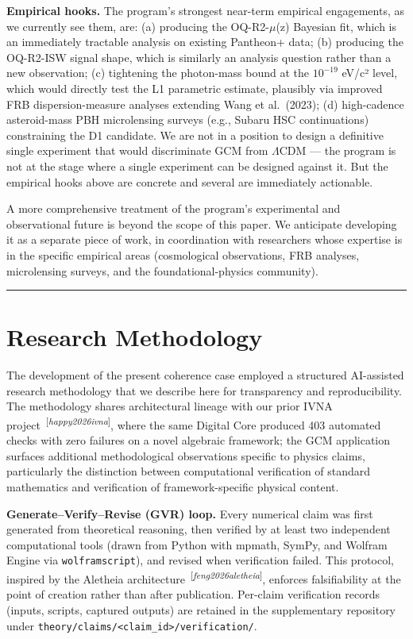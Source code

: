 \documentclass[12pt]{article}
\theoremstyle{definition}
\theoremstyle{remark}
\providecommand{\fallbackcite}[1]{\textsuperscript{[\textit{#1}]}}
\renewcommand{\cite}[1]{\fallbackcite{#1}}
\begin{document}
\textbf{Empirical hooks.} The program's strongest near-term empirical
engagements, as we currently see them, are: (a) producing the
OQ-R2-\(\mu\)(z) Bayesian fit, which is an immediately tractable
analysis on existing Pantheon+ data; (b) producing the OQ-R2-ISW signal
shape, which is similarly an analysis question rather than a new
observation; (c) tightening the photon-mass bound at the \(10^{-19}\)
eV/c² level, which would directly test the L1 parametric estimate,
plausibly via improved FRB dispersion-measure analyses extending Wang et
al.~(2023); (d) high-cadence asteroid-mass PBH microlensing surveys
(e.g., Subaru HSC continuations) constraining the D1 candidate. We are
not in a position to design a definitive single experiment that would
discriminate GCM from \(\Lambda\)CDM --- the program is not at the stage
where a single experiment can be designed against it. But the empirical
hooks above are concrete and several are immediately actionable.

A more comprehensive treatment of the program's experimental and
observational future is beyond the scope of this paper. We anticipate
developing it as a separate piece of work, in coordination with
researchers whose expertise is in the specific empirical areas
(cosmological observations, FRB analyses, microlensing surveys, and the
foundational-physics community).

\begin{center}\rule{0.5\linewidth}{0.5pt}\end{center}

\section{Research Methodology}
\label{sec:methodology}

The development of the present coherence case employed a structured AI-assisted research methodology that we describe here for transparency and reproducibility. The methodology shares architectural lineage with our prior IVNA project~\cite{happy2026ivna}, where the same Digital Core produced 403 automated checks with zero failures on a novel algebraic framework; the GCM application surfaces additional methodological observations specific to physics claims, particularly the distinction between computational verification of standard mathematics and verification of framework-specific physical content.

\textbf{Generate--Verify--Revise (GVR) loop.} Every numerical claim was first generated from theoretical reasoning, then verified by at least two independent computational tools (drawn from Python with mpmath, SymPy, and Wolfram Engine via \texttt{wolframscript}), and revised when verification failed. This protocol, inspired by the Aletheia architecture~\cite{feng2026aletheia}, enforces falsifiability at the point of creation rather than after publication. Per-claim verification records (inputs, scripts, captured outputs) are retained in the supplementary repository under \texttt{theory/claims/<claim\_id>/verification/}.
\end{document}
